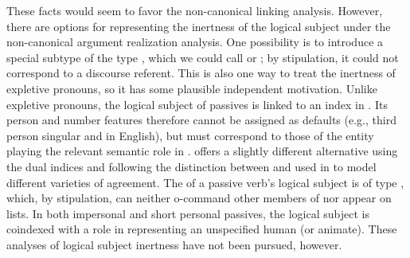 \documentclass[output=paper
                ,modfonts
                ,nonflat
	        ,collection
	        ,collectionchapter
	        ,collectiontoclongg
 	        ,biblatex
                ,babelshorthands
                ,newtxmath
                ,draftmode
                ,colorlinks, citecolor=brown
]{./langsci/langscibook}
\begin{document}
These facts would seem to favor the non-canonical linking analysis.
However, there are options for representing the inertness of the logical subject under the non-canonical argument realization analysis.
One possibility is to introduce a special subtype of the type , which we could call  or ; by stipulation, it could not correspond to a discourse referent.
This is also one way to treat the inertness of expletive pronouns, so it has some plausible independent motivation.
Unlike expletive pronouns, the logical subject of passives is linked to an index in .
Its person and number features therefore cannot be assigned as defaults (e.g., third person singular  and  in English), but must correspond to those of the entity playing the relevant semantic role in .
\citet[251--253]{Davis2001} offers a slightly different alternative using the dual indices  and  following the distinction between  and  used in \citet[240--250]{Kathol1999b} to model different varieties of agreement.
The  of a passive verb's logical subject is of type , which, by stipulation, can neither o-command other members of \argst nor appear on \val lists.
In both impersonal and short personal passives, the logical subject is coindexed with a role in  representing an unspecified human (or animate).
These analyses of logical subject inertness have not been pursued, however.

\end{document}
